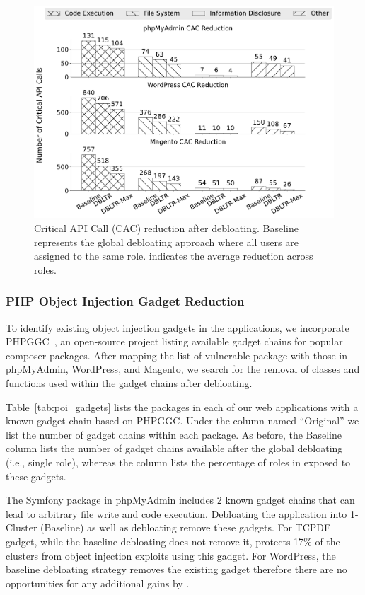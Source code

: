 \begin{figure}[t]
    \centering
    \includegraphics[width=\linewidth]{figures/dbltr/cac_reduction_spectral_bw.pdf}
    \caption{Critical API Call (CAC) reduction after debloating. Baseline represents the global debloating approach where all users are assigned to the same role. \dbltr{} indicates the average reduction across roles.}
    \label{fig:cac_reduction}
\end{figure}

\subsubsection{PHP Object Injection Gadget Reduction}

To identify existing object injection gadgets in the applications, we incorporate PHPGGC~\cite{PHPGGC}, an open-source project listing available gadget chains for popular composer packages. 
After mapping the list of vulnerable package with those in phpMyAdmin, WordPress, and Magento, we search for the removal of classes and functions used within the gadget chains after debloating. 

Table~\ref{tab:poi_gadgets} lists the packages in each of our web applications with a known gadget chain based on PHPGGC. 
Under the column named ``Original'' we list the number of gadget chains within each package. 
As before, the Baseline column lists the number of gadget chains available after the global debloating (i.e., single role), whereas the \dbltr{} column lists the percentage of roles in \dbltr{} exposed to these gadgets. 

The Symfony package in phpMyAdmin includes 2 known gadget chains that can lead to arbitrary file write and code execution. 
Debloating the application into 1-Cluster (Baseline) as well as \dbltr{} debloating remove these gadgets. 
For TCPDF gadget, while the baseline debloating does not remove it, \dbltr{} protects 17\% of the clusters from object injection exploits using this gadget. 
For WordPress, the baseline debloating strategy removes the existing gadget therefore there are no opportunities for any additional gains by \dbltr{}.

